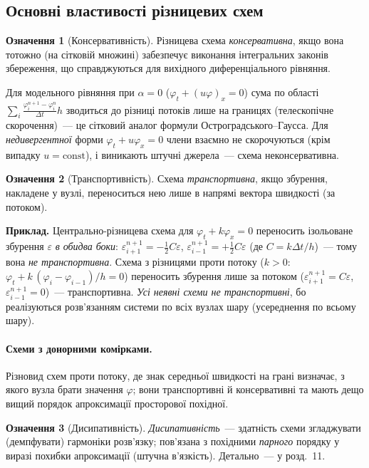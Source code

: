 \documentclass[12pt,a4paper]{article}
\theoremstyle{definition}
\newtheorem{ozn}{Означення}[section]
\theoremstyle{plain}
\begin{document}
\subsection{Основні властивості різницевих схем}

\begin{ozn}[Консервативність]
Різницева схема \emph{консервативна}, якщо вона тотожно (на сітковій
множині) забезпечує виконання інтегральних законів збереження, що
справджуються для вихідного диференціального рівняння.
\end{ozn}
Для модельного рівняння при $\alpha=0$ ($\varphi_t+(u\varphi)_x=0$)
сума по області
$\sum_i \tfrac{\varphi_i^{n+1}-\varphi_i^{n}}{\Delta t}h$
зводиться до різниці потоків лише на границях (телескопічне
скорочення)~--- це сітковий аналог формули Остроградського--Гаусса.
Для \emph{недивергентної} форми $\varphi_t+u\varphi_x=0$ члени
взаємно не скорочуються (крім випадку $u=\mathrm{const}$), і виникають
штучні джерела~--- схема неконсервативна.

\begin{ozn}[Транспортивність]
Схема \emph{транспортивна}, якщо збурення, накладене у вузлі,
переноситься нею лише в напрямі вектора швидкості (за потоком).
\end{ozn}
\textbf{Приклад.} Центрально-різницева схема для
$\varphi_t+k\varphi_x=0$ переносить ізольоване збурення $\varepsilon$
\emph{в обидва боки}:
$\varepsilon_{i+1}^{n+1}=-\tfrac12 C\varepsilon$,
$\varepsilon_{i-1}^{n+1}=+\tfrac12 C\varepsilon$ (де $C=k\Delta t/h$)~---
тому вона \emph{не транспортивна}. Схема з різницями проти потоку
($k>0$: $\varphi_t+k\,(\varphi_i-\varphi_{i-1})/h=0$) переносить
збурення лише за потоком ($\varepsilon_{i+1}^{n+1}=C\varepsilon$,
$\varepsilon_{i-1}^{n+1}=0$)~--- транспортивна. \emph{Усі неявні схеми
не транспортивні}, бо реалізуються розв'язанням системи по всіх вузлах
шару (усереднення по всьому шару).

\paragraph{Схеми з донорними комірками.} Різновид схем проти потоку, де
знак середньої швидкості на грані визначає, з якого вузла брати значення
$\varphi$; вони транспортивні й консервативні та мають дещо вищий
порядок апроксимації просторової похідної.

\begin{ozn}[Дисипативність]
\emph{Дисипативність}~--- здатність схеми згладжувати (демпфувати)
гармоніки розв'язку; пов'язана з похідними \emph{парного} порядку у
виразі похибки апроксимації (штучна в'язкість). Детально~--- у розд.~11.
\end{ozn}
\end{document}

